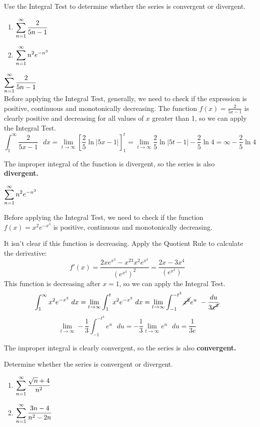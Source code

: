 \documentclass[12pt]{article}
\begin{document}
Use the Integral Test to determine whether the series is convergent or divergent.
\begin{enumerate}[label=\alph*)]
\item $\mathlarger{\sum_{n=1}^{\infty} \frac{2}{5n - 1}}$
\item $\mathlarger{\sum_{n=1}^{\infty} n^2e^{-n^3}}$
\end{enumerate}
\begin{solution}
$\mathlarger{\sum_{n=1}^{\infty} \frac{2}{5n - 1}}$~\\

Before applying the Integral Test, generally, we need to check if the expression is positive, continuous and monotonically decreasing.
The function $f(x) = \frac{2}{5x - 1}$ is clearly positive and decreasing for all values of $x$ greater than 1, so we can apply the Integral Test.
$$\int^{\infty}_1 \frac{2}{5x - 1} \text{ }dx  = \lim_{t \to \infty} \left[ \frac{2}{5} \ln  \left|5x - 1 \right| \right]_1^t = \lim_{t \to \infty} \frac{2}{5} \ln \left|5t - 1 \right| - \frac{2}{5} \ln 4 = \infty - \frac{2}{5} \ln 4 $$

The improper integral of the function is divergent, so the series is also \textbf{divergent.}
\end{solution}

\begin{solution}
$\mathlarger{\sum_{n=1}^{\infty} n^2e^{-n^3}}$

Before applying the Integral Test, we need to check if the function $f(x) = x^{2}e^{-x^{3}}$ is positive, continuous and monotonically decreasing.

It isn't clear if this function is decreasing.
Apply the Quotient Rule to calculate the derivative:
$$f'(x) = \frac{2xe^{x^3} - x^23x^2e^{x^3}}{(e^{x^3}) ^2}  = \frac{2x - 3x^4}{(e^{x^3})}$$
This function is decreasing after $x = 1$, so we can apply the Integral Test.
$$\int^{\infty}_1 x^2e^{-x^3} \text{ }dx = \lim_{t \to \infty} \int^{t}_1 x^2e^{-x^3} \text{ } dx
= \lim_{t \to \infty} \int^{-t^3}_{-1} \cancel{x^2}e^{u} \text{ } -\frac{du}{3\cancel{x^{2}}}
$$
$$\lim_{t \to \infty} -\frac{1}{3}\int^{-t^3}_{-1} e^{u} \text{ } du = -\frac{1}{3}\lim_{t \to \infty} e^{u} \text{ } du = \frac{1}{3e}$$

The improper integral is clearly convergent, so the series is also \textbf{convergent.}

\end{solution}
\pagebreak
Determine whether the series is convergent or divergent.
\begin{enumerate}[label=\alph*)]
\item $\mathlarger{\sum_{n=1}^{\infty} \frac{\sqrt{n} + 4}{n^2}}$
\item $\mathlarger{\sum_{n=1}^{\infty} \frac{3n - 4}{n^2 - 2n}}$
\end{enumerate}
\end{document}
